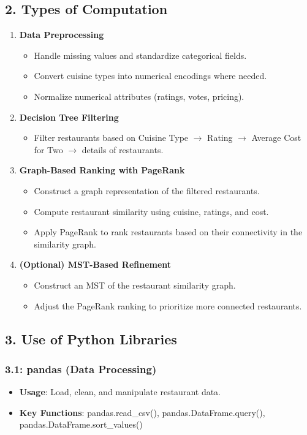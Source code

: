 \documentclass[fontsize=11pt]{article}
\begin{document}
\subsection*{2. Types of Computation}
\begin{enumerate}
    \item \textbf{Data Preprocessing}
    \begin{itemize}
        \item Handle missing values and standardize categorical fields.
        \item Convert cuisine types into numerical encodings where needed.
        \item Normalize numerical attributes (ratings, votes, pricing).
    \end{itemize}
    \item \textbf{Decision Tree Filtering}
    \begin{itemize}
        \item Filter restaurants based on Cuisine Type $\rightarrow$ Rating $\rightarrow$ Average Cost for Two $\rightarrow$ details of restaurants.
    \end{itemize}
    \item \textbf{Graph-Based Ranking with PageRank}
    \begin{itemize}
        \item Construct a graph representation of the filtered restaurants.
        \item Compute restaurant similarity using cuisine, ratings, and cost.
        \item Apply PageRank to rank restaurants based on their connectivity in the similarity graph.
    \end{itemize}
    \item \textbf{(Optional) MST-Based Refinement}
    \begin{itemize}
        \item Construct an MST of the restaurant similarity graph.
        \item Adjust the PageRank ranking to prioritize more connected restaurants.
    \end{itemize}
\end{enumerate}

\subsection*{3. Use of Python Libraries}
\subsubsection*{3.1: pandas (Data Processing)}
\begin{itemize}
    \item \textbf{Usage}: Load, clean, and manipulate restaurant data.
    \item \textbf{Key Functions}: pandas.read\_csv(), pandas.DataFrame.query(), pandas.DataFrame.sort\_values()
\end{itemize}
\end{document}
